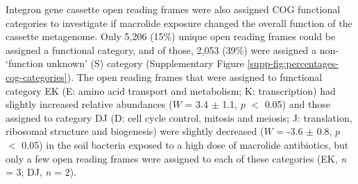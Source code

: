 Integron gene cassette open reading frames were also assigned COG functional categories to investigate if macrolide exposure changed the overall function of the cassette metagenome.
Only 5,206 (15\%) unique open reading frames could be assigned a functional category, and of those, 2,053 (39\%) were assigned a non- ‘function unknown’ (S) category (Supplementary Figure \ref{supp-fig:percentages-cog-categories}).
The open reading frames that were assigned to functional category EK (E: amino acid transport and metabolism; K: transcription) had slightly increased relative abundances ($W$ = 3.4 $\pm$ 1.1, $p$ $<$ 0.05) and those assigned to category DJ (D: cell cycle control, mitosis and meiosis; J: translation, ribosomal structure and biogenesis) were slightly decreased ($W$ = -3.6 $\pm$ 0.8, $p$ $<$ 0.05) in the soil bacteria exposed to a high dose of macrolide antibiotics, but only a few open reading frames were assigned to each of these categories (EK, \textit{n} = 3; DJ, \textit{n} = 2).
